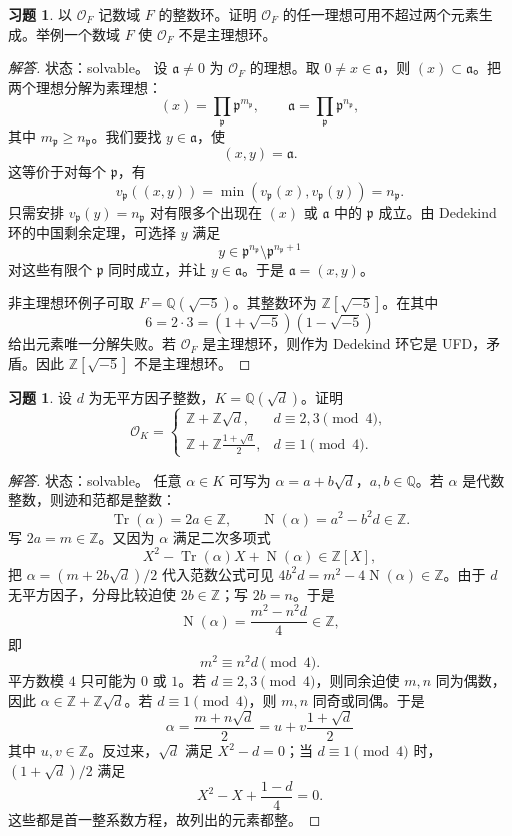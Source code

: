 \documentclass[11pt,a4paper,openany]{ctexbook}
\numberwithin{equation}{chapter}
\newcommand{\Q}{\mathbb{Q}}
\newcommand{\Z}{\mathbb{Z}}
\newcommand{\OF}{\mathcal{O}_F}
\newcommand{\Tr}{\operatorname{Tr}}
\newcommand{\Nm}{\operatorname{N}}
\theoremstyle{plain}
\theoremstyle{definition}
\newtheorem{exercise}[theorem]{习题}
\theoremstyle{remark}
\begin{document}
\begin{exercise}
以 $\OF$ 记数域 $F$ 的整数环。证明 $\OF$ 的任一理想可用不超过两个元素生成。举例一个数域 $F$ 使 $\OF$ 不是主理想环。
\end{exercise}

\begin{proof}[解答]
状态：solvable。
设 $\mathfrak a\ne0$ 为 $\OF$ 的理想。取 $0\ne x\in\mathfrak a$，则 $(x)\subset\mathfrak a$。把两个理想分解为素理想：
\[
(x)=\prod_{\mathfrak p}\mathfrak p^{m_{\mathfrak p}},\qquad
\mathfrak a=\prod_{\mathfrak p}\mathfrak p^{n_{\mathfrak p}},
\]
其中 $m_{\mathfrak p}\ge n_{\mathfrak p}$。我们要找 $y\in\mathfrak a$，使
\[
(x,y)=\mathfrak a.
\]
这等价于对每个 $\mathfrak p$，有
\[
v_{\mathfrak p}((x,y))
=\min(v_{\mathfrak p}(x),v_{\mathfrak p}(y))
=n_{\mathfrak p}.
\]
只需安排 $v_{\mathfrak p}(y)=n_{\mathfrak p}$ 对有限多个出现在 $(x)$ 或 $\mathfrak a$ 中的 $\mathfrak p$ 成立。由 Dedekind 环的中国剩余定理，可选择 $y$ 满足
\[
y\in\mathfrak p^{n_{\mathfrak p}}\setminus \mathfrak p^{n_{\mathfrak p}+1}
\]
对这些有限个 $\mathfrak p$ 同时成立，并让 $y\in\mathfrak a$。于是 $\mathfrak a=(x,y)$。

非主理想环例子可取 $F=\Q(\sqrt{-5})$。其整数环为 $\Z[\sqrt{-5}]$。在其中
\[
6=2\cdot3=(1+\sqrt{-5})(1-\sqrt{-5})
\]
给出元素唯一分解失败。若 $\mathcal O_F$ 是主理想环，则作为 Dedekind 环它是 UFD，矛盾。因此 $\Z[\sqrt{-5}]$ 不是主理想环。
\end{proof}

\begin{exercise}
设 $d$ 为无平方因子整数，$K=\Q(\sqrt d)$。证明
\[
\mathcal O_K=
\begin{cases}
\Z+\Z\sqrt d,&d\equiv2,3\pmod4,\\
\Z+\Z\frac{1+\sqrt d}{2},&d\equiv1\pmod4.
\end{cases}
\]
\end{exercise}

\begin{proof}[解答]
状态：solvable。
任意 $\alpha\in K$ 可写为 $\alpha=a+b\sqrt d$，$a,b\in\Q$。若 $\alpha$ 是代数整数，则迹和范都是整数：
\[
\Tr(\alpha)=2a\in\Z,\qquad
\Nm(\alpha)=a^2-b^2d\in\Z.
\]
写 $2a=m\in\Z$。又因为 $\alpha$ 满足二次多项式
\[
X^2-\Tr(\alpha)X+\Nm(\alpha)\in\Z[X],
\]
把 $\alpha=(m+2b\sqrt d)/2$ 代入范数公式可见 $4b^2d=m^2-4\Nm(\alpha)\in\Z$。由于 $d$ 无平方因子，分母比较迫使 $2b\in\Z$；写 $2b=n$。于是
\[
\Nm(\alpha)=\frac{m^2-n^2d}{4}\in\Z,
\]
即
\[
m^2\equiv n^2d\pmod4.
\]
平方数模 $4$ 只可能为 $0$ 或 $1$。若 $d\equiv2,3\pmod4$，则同余迫使 $m,n$ 同为偶数，因此 $\alpha\in\Z+\Z\sqrt d$。若 $d\equiv1\pmod4$，则 $m,n$ 同奇或同偶。于是
\[
\alpha=\frac{m+n\sqrt d}{2}
=u+v\frac{1+\sqrt d}{2}
\]
其中 $u,v\in\Z$。反过来，$\sqrt d$ 满足 $X^2-d=0$；当 $d\equiv1\pmod4$ 时，$(1+\sqrt d)/2$ 满足
\[
X^2-X+\frac{1-d}{4}=0.
\]
这些都是首一整系数方程，故列出的元素都整。
\end{proof}
\end{document}
